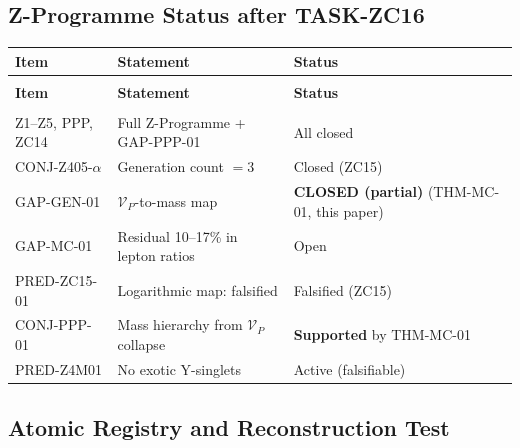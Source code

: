 \documentclass[12pt, a4paper]{article}
\begin{document}
\subsection{Z-Programme Status after TASK-ZC16}
\label{zc16:sec:status}

\begin{derivedbox}[title={Z-Programme Status after TASK-ZC16}]
{\small
\renewcommand{\arraystretch}{1.30}
\begin{longtable}{>{\raggedright\arraybackslash}p{3.5cm}
                  >{\raggedright\arraybackslash}p{7.0cm}
                  >{\raggedright\arraybackslash}p{2.5cm}}
\toprule
\textbf{Item} & \textbf{Statement} & \textbf{Status} \\
\midrule
\endfirsthead
\multicolumn{3}{l}{\small\textit{(continued)}} \\[4pt]
\toprule
\textbf{Item} & \textbf{Statement} & \textbf{Status} \\
\midrule
\endhead
\midrule
\multicolumn{3}{r}{\small\textit{(continues)}} \\
\endfoot
\bottomrule
\endlastfoot
Z1--Z5, PPP, ZC14 & Full Z-Programme + GAP-PPP-01
  & All closed \\
CONJ-Z405-$\alpha$ & Generation count $=3$
  & Closed (ZC15) \\
GAP-GEN-01 & $\mathcal{V}_P$-to-mass map
  & \textbf{CLOSED (partial)} (THM-MC-01, this paper) \\
\midrule
GAP-MC-01 & Residual 10--17\% in lepton ratios
  & Open \\
PRED-ZC15-01 & Logarithmic map: falsified
  & Falsified (ZC15) \\
CONJ-PPP-01 & Mass hierarchy from $\mathcal{V}_P$ collapse
  & \textbf{Supported} by THM-MC-01 \\
PRED-Z4M01 & No exotic Y-singlets
  & Active (falsifiable) \\
\end{longtable}
}
\end{derivedbox}

\subsection{Atomic Registry and Reconstruction Test}
\label{zc16:sec:registry}
\end{document}
